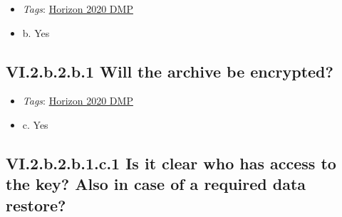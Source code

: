 \documentclass[a4paper,12pt]{report}
\begin{document}
\begin{itemize}
  \item \textit{Tags}: \ul{Horizon 2020 DMP}
  \end{itemize}




\begin{itemize}
  \item[\CheckmarkBold] b. Yes
\end{itemize}




\subsection*{\protect\textcolor{colorSecId}{VI.2.b.2.b.1} Will the archive be encrypted?}

\label{d5b27482-b598-4b8c-b534-417d4ad27394.d5784d24-0e66-4821-bd62-a711fb6d7a40.e81599af-4519-4987-b74e-9545428ed0e3.ed3d43ad-d2b5-4194-8b05-08c95da0a7f2.29498f8c-ea29-4855-82db-5b1228dc09ba.2c797727-559d-4bcf-a4a1-713accfcd602}


\begin{itemize}
  \item \textit{Tags}: \ul{Horizon 2020 DMP}
  \end{itemize}




\begin{itemize}
  \item[\CheckmarkBold] c. Yes
\end{itemize}




\subsection*{\protect\textcolor{colorSecId}{VI.2.b.2.b.1.c.1} Is it clear who has access to the key? Also in case of a required data restore?}

\label{d5b27482-b598-4b8c-b534-417d4ad27394.d5784d24-0e66-4821-bd62-a711fb6d7a40.e81599af-4519-4987-b74e-9545428ed0e3.ed3d43ad-d2b5-4194-8b05-08c95da0a7f2.29498f8c-ea29-4855-82db-5b1228dc09ba.2c797727-559d-4bcf-a4a1-713accfcd602.2a127f74-c296-40f9-8ff5-d2a5a0b4ab98.905d4cda-afa1-4cc0-8df6-3d989c7b8b2e}
\end{document}
